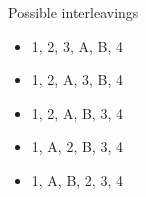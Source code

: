 \documentclass[presentation]{beamer}\mode<presentation>{\usetheme{AMSBolognaFC}}
\begin{document}
\begin{frame}[allowframebreaks]
    \begin{exampleblock}{Possible interleavings}
        \begin{multicols}{3}
            \begin{itemize}
                \item 1, 2, 3, A, B, 4
                \item 1, 2, A, 3, B, 4
                \item 1, 2, A, B, 3, 4
                \item 1, A, 2, B, 3, 4
                \item 1, A, B, 2, 3, 4
            \end{itemize}
        \end{multicols}
    \end{exampleblock}


%    

\end{frame}
\end{document}
